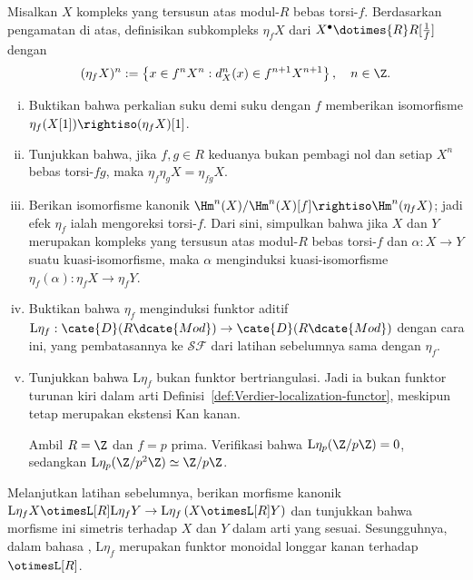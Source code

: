 \begin{Exercises}
	Misalkan $X$ kompleks yang tersusun atas modul-$R$ bebas torsi-$f$.
	Berdasarkan pengamatan di atas, definisikan subkompleks $\eta_fX$ dari
	$X^\bullet\dotimes{R}R[\frac{1}{f}]$ dengan
	\[ (\eta_f X)^n := \left\{ x \in f^n X^n : d_X^n(x) \in f^{n+1} X^{n+1} \right\}, \quad n \in \Z . \]
	\begin{enumerate}[(i)]
		\item Buktikan bahwa perkalian suku demi suku dengan $f$ memberikan
		isomorfisme $\eta_f(X[1])\rightiso(\eta_fX)[1]$.
		\item Tunjukkan bahwa, jika $f,g\in R$ keduanya bukan pembagi nol dan
		setiap $X^n$ bebas torsi-$fg$, maka
		$\eta_f\eta_gX=\eta_{fg}X$.
		\item Berikan isomorfisme kanonik
		$\Hm^n(X)/\Hm^n(X)[f]\rightiso\Hm^n(\eta_fX)$; jadi efek $\eta_f$
		ialah mengoreksi torsi-$f$. Dari sini, simpulkan bahwa jika $X$ dan $Y$
		merupakan kompleks yang tersusun atas modul-$R$ bebas torsi-$f$ dan
		$\alpha:X\to Y$ suatu kuasi-isomorfisme, maka $\alpha$ menginduksi
		kuasi-isomorfisme $\eta_f(\alpha):\eta_fX\to\eta_fY$.
		\item Buktikan bahwa $\eta_f$ menginduksi funktor aditif
		$\mathrm{L}\eta_f:\cate{D}(R\dcate{Mod})\to\cate{D}(R\dcate{Mod})$
		dengan cara ini, yang pembatasannya ke $\mathcal{SF}$ dari latihan
		sebelumnya sama dengan $\eta_f$.
		\item Tunjukkan bahwa $\mathrm{L}\eta_f$ bukan funktor
		bertriangulasi. Jadi ia bukan funktor turunan kiri dalam arti
		Definisi~\ref{def:Verdier-localization-functor}, meskipun tetap merupakan
		ekstensi Kan kanan.

		\begin{hint}
			Ambil $R=\Z$ dan $f=p$ prima. Verifikasi bahwa
			$\mathrm{L}\eta_p(\Z/p\Z)=0$, sedangkan
			$\mathrm{L}\eta_p(\Z/p^2\Z)\simeq\Z/p\Z$.
		\end{hint}
	\end{enumerate}

	\item Melanjutkan latihan sebelumnya, berikan morfisme kanonik
	$\mathrm{L}\eta_f X \otimesL[R] \mathrm{L}\eta_f Y \to
	\mathrm{L}\eta_f\left( X \otimesL[R] Y \right)$ dan tunjukkan bahwa
	morfisme ini simetris terhadap $X$ dan $Y$ dalam arti yang sesuai.
	Sesungguhnya, dalam bahasa \cite[Catatan 3.1.8]{Li1},
	$\mathrm{L}\eta_f$ merupakan funktor monoidal longgar kanan terhadap
	$\otimesL[R]$.
\end{Exercises}
